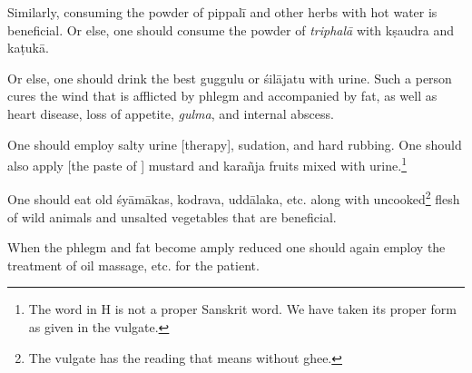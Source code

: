 \begin{translation}
\begin{tt}
        \item[34]


        \begin{sloka}


            Similarly, consuming the powder of \gls{pippalī} and other herbs with hot water
            is beneficial. Or else, one should consume the powder of \textit{triphalā} with
            \gls{kṣaudra} and \gls{kaṭukā}.


        \end{sloka}




        \item[35-38]


        \begin{sloka}

            Or
            else, one should drink the best \gls{guggulu} or \gls{śilājatu} with urine. Such a
            person cures the wind that is afflicted by phlegm and accompanied by fat, as
            well as heart disease, loss of appetite, \textit{gulma}, and internal abscess.



            One
            should employ salty urine [therapy], sudation, and hard rubbing. One should
            also apply [the paste of ] mustard and \gls{karañja} fruits mixed with
            urine.\footnote{The word  in H is not a proper Sanskrit word. We
                have taken its proper form  as given in the vulgate.}



            One
            should eat old \gls{śyāmāka}s, \gls{kodrava}, \gls{uddālaka}, etc. along with
            uncooked\footnote{The vulgate has the reading  that means
                without ghee.} flesh of wild animals and unsalted vegetables that are beneficial.


        \end{sloka}




        \item[39]


        \begin{sloka}


            When the phlegm and fat become amply reduced one should again employ the
            treatment of oil massage, etc. for the patient.


        \end{sloka}






    \end{tt}




\end{translation}

